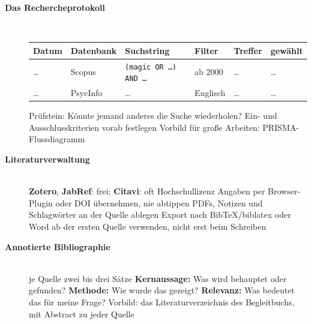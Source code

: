 \begin{description}
\item[{\rot\bf Das Rechercheprotokoll}]~\\[-\lblskip]
\begin{center}
\small
\begin{tabular}{llllll}
\toprule
\textbf{Datum} & \textbf{Datenbank} & \textbf{Suchstring} & \textbf{Filter} & \textbf{Treffer} & \textbf{gewählt} \\
\midrule
\dots & Scopus & \texttt{(magic OR \dots) AND \dots} & ab 2000 & \dots & \dots \\
\dots & PsycInfo & \dots & Englisch & \dots & \dots \\
\bottomrule
\end{tabular}
\end{center}
\bi
  \ite Prüfstein: Könnte jemand anderes die Suche wiederholen?
  \ite Ein- und Ausschlusskriterien vorab festlegen
  \ite Vorbild für große Arbeiten: PRISMA-Flussdiagramm
    \parencite{page2021prisma}
\ei
\os{\newpage}

\item[{\rot\bf Literaturverwaltung}]~\\[-\lblskip]
\bi
  \ite \textbf{Zotero}, \textbf{JabRef}: frei; \textbf{Citavi}: oft
    Hochschullizenz
  \ite Angaben per Browser-Plugin oder DOI übernehmen, nie abtippen
  \ite PDFs, Notizen und Schlagwörter an der Quelle ablegen
  \ite Export nach BibTeX/biblatex oder Word
  \ite ab der ersten Quelle verwenden, nicht erst beim Schreiben
\ei
\os{\newpage}

\item[{\rot\bf Annotierte Bibliographie}]~\\[-\lblskip]
\bi
  \ite je Quelle zwei bis drei Sätze
  \ite \textbf{Kernaussage:} Was wird behauptet oder gefunden?
  \ite \textbf{Methode:} Wie wurde das gezeigt?
  \ite \textbf{Relevanz:} Was bedeutet das für meine Frage?
  \ite Vorbild: das Literaturverzeichnis des Begleitbuchs, mit Abstract zu
    jeder Quelle
\ei
\os{\newpage}
\end{description}

